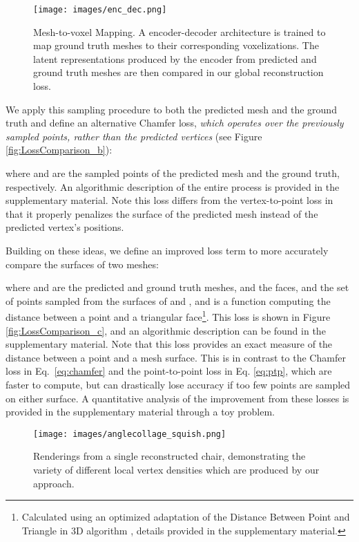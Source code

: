 \documentclass{article}
\begin{document}
\begin{figure} [t!]
\texttt{[image: images/enc\_dec.png]}
\centering
\caption{Mesh-to-voxel Mapping. A encoder-decoder architecture is trained to map ground truth meshes to their corresponding voxelizations. The latent representations produced by the encoder from predicted and ground truth meshes are then compared in our global reconstruction loss.} \label{fig:EncoderDecoder}
\end{figure}

We apply this sampling procedure to both the predicted mesh and the ground truth and define an alternative Chamfer loss, \emph{which operates over the previously sampled points, rather than the predicted vertices} (see Figure \ref{fig:LossComparison_b}):
 
where  and  are the sampled points of the predicted mesh and the ground truth, respectively. An algorithmic description of the entire process is provided in the supplementary material. Note this loss differs from the vertex-to-point loss in that it properly penalizes the surface of the predicted mesh instead of the predicted vertex's positions.

Building on these ideas, we define an improved loss term to more accurately compare the surfaces of two meshes: 

where  and  are the predicted and ground truth meshes,  and  the faces,  and  the set of points sampled from the surfaces of  and , and  is a function computing the distance between a point and a triangular face\footnote{Calculated using an optimized adaptation of the Distance Between Point and Triangle in 3D algorithm \cite{Point2Tri}, details provided in the supplementary material.}. This loss is shown in Figure \ref{fig:LossComparison_c}, and an algorithmic description can be found in the supplementary material. Note that this loss provides an exact measure of the distance between a point and a mesh surface. This is in contrast to the Chamfer loss in Eq.~\ref{eq:chamfer} and the point-to-point loss in Eq. \ref{eq:ptp}, which are faster to compute, but can drastically lose accuracy if too few points are sampled on either surface. A quantitative analysis of the improvement from these losses is provided in the supplementary material through a toy problem.

\begin{figure}[t!]
\centering
\texttt{[image: images/anglecollage\_squish.png]}
\vspace{-4mm}
\caption{Renderings from a single reconstructed chair, demonstrating the variety of different local vertex densities which are produced by our approach. } \label{fig:VertexDensity}
\end{figure}
\end{document}
